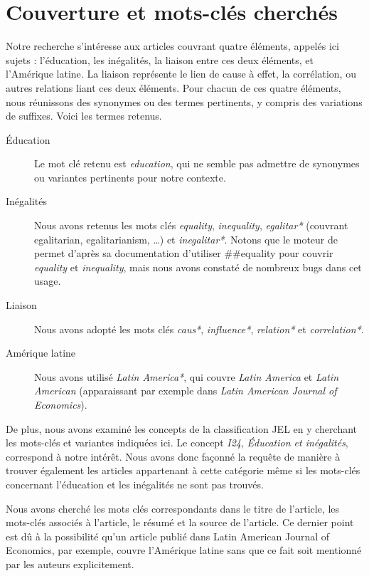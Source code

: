 \documentclass[pagesize, twoside=off, bibliography=totoc, DIV=calc, fontsize=12pt, a4paper, french]{scrartcl}
\begin{document}
\section{Couverture et mots-clés cherchés}
Notre recherche s’intéresse aux articles couvrant quatre éléments, appelés ici \og{}sujets\fg{} : l’éducation, les inégalités, la liaison entre ces deux éléments, et l’Amérique latine. La liaison représente le lien de cause à effet, la corrélation, ou autres relations liant ces deux éléments. Pour chacun de ces quatre éléments, nous réunissons des synonymes ou des termes pertinents, y compris des variations de suffixes. Voici les termes retenus.

\begin{description}
  \item[Éducation] Le mot clé retenu est \emph{education}, qui ne semble pas admettre de synonymes ou variantes pertinents pour notre contexte.
  \item[Inégalités] Nous avons retenus les mots clés \emph{equality}, \emph{inequality}, \emph{egalitar*} (couvrant egalitarian, egalitarianism, …) et \emph{inegalitar*}. Notons que le moteur de \citet{ebscohost_searching_2024} permet d’après sa documentation d’utiliser \#\#equality pour couvrir \emph{equality} et \emph{inequality}, mais nous avons constaté de nombreux bugs dans cet usage.
  \item[Liaison] Nous avons adopté les mots clés \emph{caus*}, \emph{influence*}, \emph{relation*} et \emph{correlation*}.
  \item[Amérique latine] Nous avons utilisé \emph{Latin America*}, qui couvre \emph{Latin America} et \emph{Latin American} (apparaissant par exemple dans \emph{Latin American Journal of Economics}). 
\end{description}
De plus, nous avons examiné les concepts de la classification JEL en y cherchant les mots-clés et variantes indiquées ici. Le concept \emph{I24}, \emph{Éducation et inégalités}, correspond à notre intérêt.
Nous avons donc façonné la requête de manière à trouver également les articles appartenant à cette catégorie même si les mots-clés concernant l’éducation et les inégalités ne sont pas trouvés.

Nous avons cherché les mots clés correspondants dans le titre de l’article, les mots-clés associés à l’article, le résumé et la source de l’article. Ce dernier point est dû à la possibilité qu’un article publié dans Latin American Journal of Economics, par exemple, couvre l’Amérique latine sans que ce fait soit mentionné par les auteurs explicitement.
\end{document}
